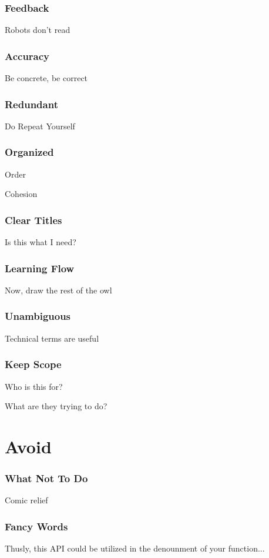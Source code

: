 \begin{frame}
\frametitle{Feedback}

Robots don't read
\end{frame}


\begin{frame}
\frametitle{Accuracy}

Be concrete, be correct

\end{frame}

\begin{frame}
\frametitle{Redundant}

Do Repeat Yourself
\end{frame}


\begin{frame}
\frametitle{Organized}

Order

Cohesion
\end{frame}

\begin{frame}
\frametitle{Clear Titles}

Is this what I need?
\end{frame}


\begin{frame}
\frametitle{Learning Flow}

Now, draw the rest of the owl
\end{frame}


\begin{frame}
\frametitle{Unambiguous}

Technical terms are useful
\end{frame}

\begin{frame}
\frametitle{Keep Scope}

Who is this for?

What are they trying to do?
\end{frame}

\section{Avoid}

\begin{frame}
\frametitle{What Not To Do}

Comic relief
\end{frame}

\begin{frame}
\frametitle{Fancy Words}

Thusly, this API could be utilized in the denounment of your function...
\end{frame}

